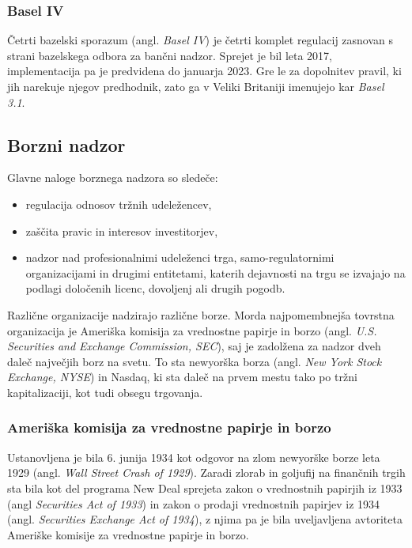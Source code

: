 \documentclass[12pt,a4paper]{amsart}
\theoremstyle{definition} %
\theoremstyle{plain} %
\begin{document}
\subsubsection{Basel IV}
Četrti bazelski sporazum (angl. \textit{Basel IV}) je četrti komplet regulacij zasnovan 
s strani bazelskega odbora za bančni nadzor. Sprejet je bil leta 2017, implementacija 
pa je predvidena do januarja 2023. Gre le za dopolnitev pravil, ki jih narekuje njegov 
predhodnik, zato ga v Veliki Britaniji imenujejo kar \textit{Basel 3.1}.


\subsection{Borzni nadzor}
Glavne naloge borznega nadzora so sledeče:
\begin{itemize}
  \item regulacija odnosov tržnih udeležencev,
  \item zaščita pravic in interesov investitorjev,
  \item nadzor nad profesionalnimi udeleženci trga, samo-regulatornimi organizacijami
	in drugimi entitetami, katerih dejavnosti na trgu se izvajajo na podlagi 
	določenih licenc, dovoljenj ali drugih pogodb.
\end{itemize}
Različne organizacije nadzirajo različne borze. Morda najpomembnejša tovrstna 
organizacija je Ameriška komisija za vrednostne papirje in borzo (angl. \textit{
U.S. Securities and Exchange Commission, SEC}), saj je zadolžena za nadzor dveh 
daleč največjih borz na svetu. To sta newyorška borza (angl. \textit{New York Stock 
Exchange, NYSE}) in Nasdaq, ki sta daleč na prvem mestu tako po tržni kapitalizaciji, 
kot tudi obsegu trgovanja. 

\subsubsection{Ameriška komisija za vrednostne papirje in borzo}
Ustanovljena je bila 6. junija 1934 kot odgovor na zlom newyorške borze leta 1929 
(angl. \textit{Wall Street Crash of 1929}). Zaradi zlorab in goljufij na finančnih trgih 
sta bila kot del programa New Deal sprejeta zakon o vrednostnih papirjih iz 1933 (angl 
\textit{Securities Act of 1933}) in zakon o prodaji vrednostnih papirjev iz 1934 (angl. \textit{ Securities 
Exchange Act of 1934}), z njima pa je bila uveljavljena avtoriteta Ameriške 
komisije za vrednostne papirje in borzo. 
\end{document}
